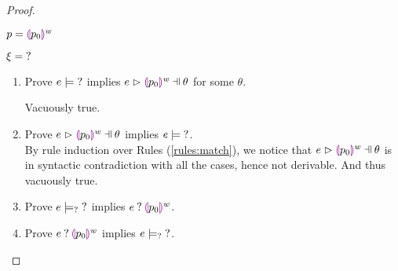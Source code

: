 \begin{proof}
\begin{byCases}
\item[\text{(\ref{rule:PTHole})}]
    \begin{pfsteps*}
    \item $p=\textcolor{violet}{\llparenthesis} p_0\textcolor{violet}{\rrparenthesis}^{w}$ 
    \item $\xi=\mathtt{?}$ 
    \end{pfsteps*}
    \begin{enumerate}
    \item Prove $e \models \mathtt{?}$ implies $\hpatmatch{e}{\hhole{p_0}{w}}{\theta}$ for some $\theta$.
        Vacuously true.
    \item Prove $\hpatmatch{e}{\hhole{p_0}{w}}{\theta}$ implies $e \models \mathtt{?}$.\\
        By rule induction over Rules (\ref{rules:match}), we notice that $\hpatmatch{e}{\hhole{p_0}{w}}{\theta}$ is in syntactic contradiction with all the cases, hence not derivable. And thus vacuously true.
    \item Prove $e \models_{?} \mathtt{?}$ implies $e \mathbin{?} \textcolor{violet}{\llparenthesis} p_0\textcolor{violet}{\rrparenthesis}^{w}$.
    \item Prove $e \mathbin{?} \textcolor{violet}{\llparenthesis} p_0\textcolor{violet}{\rrparenthesis}^{w}$ implies $e \models_{?} \mathtt{?}$.
    \end{enumerate}
    

\end{byCases}
\end{proof}

